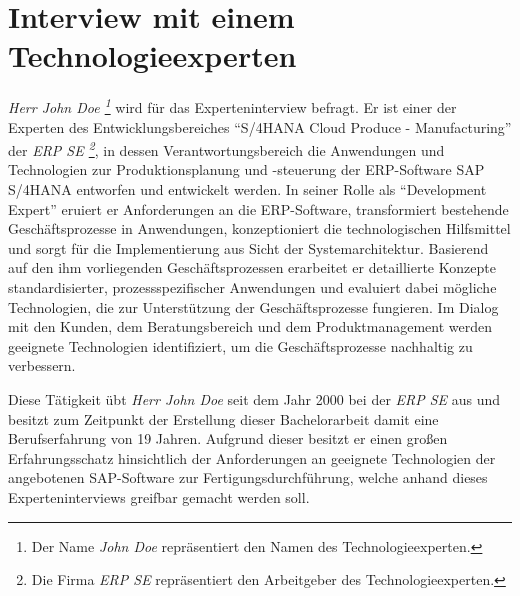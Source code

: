 \tocless\section{Interview mit einem Technologieexperten}\label{ah:interviewDev}

\textit{Herr John Doe \footnote{Der Name \textit{John Doe} repräsentiert den Namen des Technologieexperten.}} wird für das Experteninterview befragt.
 Er ist einer der Experten des Entwicklungsbereiches \enquote{S/4HANA Cloud Produce - Manufacturing} der \textit{ERP SE \footnote{Die Firma \textit{ERP SE} repräsentiert den Arbeitgeber des Technologieexperten.}}, in dessen Verantwortungsbereich die Anwendungen und Technologien zur Produktionsplanung und -steuerung der \ac{ERP}-Software SAP S/4HANA entworfen und entwickelt werden.
 In seiner Rolle als \enquote{Development Expert} eruiert er Anforderungen an die \ac{ERP}-Software, transformiert bestehende Geschäftsprozesse in Anwendungen, konzeptioniert die technologischen Hilfsmittel und sorgt für die Implementierung aus Sicht der Systemarchitektur. Basierend auf den ihm vorliegenden Geschäftsprozessen erarbeitet er detaillierte Konzepte standardisierter, prozessspezifischer Anwendungen und evaluiert dabei mögliche Technologien, die zur Unterstützung der Geschäftsprozesse fungieren. Im Dialog mit den Kunden, dem Beratungsbereich und dem Produktmanagement werden geeignete Technologien identifiziert, um die Geschäftsprozesse nachhaltig zu verbessern. 
 
Diese Tätigkeit übt \textit{Herr John Doe} seit dem Jahr 2000 bei der \textit{ERP SE} aus und besitzt zum Zeitpunkt der Erstellung dieser Bachelorarbeit damit eine Berufserfahrung von 19 Jahren. Aufgrund dieser besitzt er einen großen Erfahrungsschatz hinsichtlich der Anforderungen an geeignete Technologien der angebotenen SAP-Software zur Fertigungsdurchführung, welche anhand dieses Experteninterviews greifbar gemacht werden soll.


